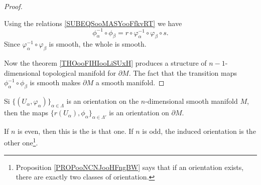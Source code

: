 \begin{proof}
\begin{subproof}
		Using the relations \eqref{SUBEQSooMASYooFfkvRT} we have
		\begin{equation}
			\phi_{\alpha}^{-1}\circ\phi_{\beta}=r\circ \varphi_{\alpha}^{-1}\circ\varphi_{\beta}\circ s.
		\end{equation}
		Since \( \varphi_{\alpha}^{-1}\circ\varphi_{\beta}\) is smooth, the whole is smooth.
	\end{subproof}
	Now the theorem \ref{THOooFIHIooLiSUxH} produces a structure of \( n-1\)-dimensional topological manifold for \( \partial M\). The fact that the transition maps \( \phi_{\alpha}^{-1}\circ\phi_{\beta}\) is smooth makes \( \partial M\) a smooth manifold.
\end{proof}

\begin{theorem}	\label{THOooENBHooOfBTlA}
	Si \( \{ (U_{\alpha}, \varphi_{\alpha}) \}_{\alpha\in \Lambda}\) is an orientation on the \( n\)-dimensional smooth manifold \( M\), then the maps \( \{ r(U_{\alpha}), \phi_{\alpha} \}_{\alpha\in \Lambda'}\) is an orientation on \( \partial M\).

	If \( n\) is even, then this is the  is that one. If \( n\) is odd, the induced orientation is the other one\footnote{Proposition \ref{PROPooNCNJooHFngBW} says that if an orientation exists, there are exactly two classes of orientation.}.
\end{theorem}

